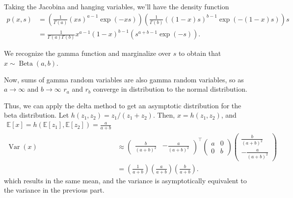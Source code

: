 \documentclass[letterpaper,11pt]{article}
\begin{document}
\begin{enumerate}
\begin{enumerate}
\begin{description}
      Taking the Jacobina and hanging variables, we'll have the density function
      \begin{align*}
        p\left(x, s\right)
        &= \left(\frac{1}{\Gamma\left(a\right)}\left(xs\right)^{a - 1}\exp\left(-xs\right)\right)
          \left(\frac{1}{\Gamma\left(b\right)}\left(\left(1 - x\right)s\right)^{b - 1}
          \exp\left(-\left(1-x\right)s\right)\right)s \\
        &= \frac{1}{\Gamma\left(a\right)\Gamma\left(b\right)}x^{a-1}\left(1-x\right)^{b-1}
          \left(s^{a + b - 1}\exp\left(-s\right)\right).
      \end{align*}

      We recognize the gamma function and marginalize over $s$ to obtain that
      $x \sim \operatorname{Beta}\left(a, b\right)$.

      Now, sums of gamma random variables are also gamma random variables, so as
      $a \rightarrow \infty$ and $b \rightarrow \infty$ $r_a$ and $r_b$ converge
      in distribution to the normal distribution.

      Thus, we can apply the delta method to get an asymptotic distribution for
      the beta distribution. Let
      $h\left(z_1,z_2\right) = z_1/\left(z_1 + z_2\right)$. Then,
      $x = h\left(z_1,z_2\right)$, and
      \begin{align}
        \mathbb{E}\left[x\right] = h\left(\mathbb{E}\left[z_1\right],
        \mathbb{E}\left[z_2\right]\right) = \frac{a}{a + b}
        \label{eqn:p1_asymptotic_mean} \\
        \operatorname{Var}\left(x\right)
        &\approx
        \begin{pmatrix}
          \frac{b}{\left(a + b\right)^2} & -\frac{a}{\left(a + b\right)^2}
        \end{pmatrix}^\intercal
        \begin{pmatrix}
          a & 0 \\
          0 & b
        \end{pmatrix}
        \begin{pmatrix}
          \frac{b}{\left(a + b\right)^2} \\ -\frac{a}{\left(a + b\right)^2}
        \end{pmatrix} \nonumber\\
        &= \left(\frac{1}{a + b}\right)\left(\frac{a}{a + b}\right)
          \left(\frac{b}{a + b}\right) \label{eqn:p1_asymptotic_variance}.
      \end{align}
      which results in the same mean, and the variance is asymptotically
      equivalent to the variance in the previous part.
      

\end{description}
\end{enumerate}
\end{enumerate}
\end{document}
